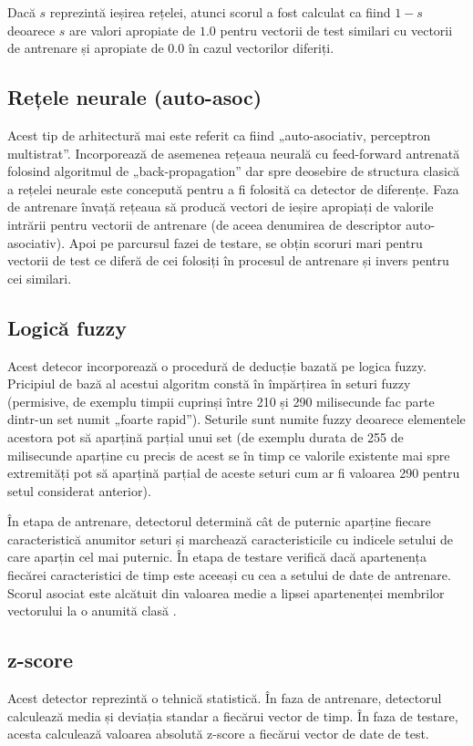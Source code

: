 \documentclass[9pt,shortpaper,twoside,web]{ieeecolor}
\begin{document}
	Dacă $s$ reprezintă ieșirea rețelei, atunci scorul a fost calculat ca fiind $1 - s$ deoarece $s$ are valori apropiate de $1.0$  pentru vectorii de test similari cu vectorii de antrenare și apropiate de $0.0$ în cazul vectorilor diferiți.

\subsection{Rețele neurale (auto-asoc)}
	Acest tip de arhitectură mai este referit ca fiind „auto-asociativ, perceptron multistrat”. Incorporează de asemenea rețeaua neurală cu feed-forward antrenată folosind algoritmul de „back-propagation” dar spre deosebire de structura clasică a rețelei neurale este concepută pentru a fi folosită ca detector de diferențe\cite{13}. Faza de antrenare învață rețeaua să producă vectori de ieșire apropiați de valorile intrării pentru vectorii de antrenare (de aceea denumirea de descriptor auto-asociativ). Apoi pe parcursul fazei de testare, se obțin scoruri mari pentru vectorii de test ce diferă de cei folosiți în procesul de antrenare și invers pentru cei similari.

\subsection{Logică fuzzy}
	Acest detecor incorporează o procedură de deducție bazată pe logica fuzzy. Pricipiul de bază al acestui algoritm constă în împărțirea în seturi fuzzy (permisive, de exemplu timpii cuprinși între 210 și 290 milisecunde fac parte dintr-un set numit „foarte rapid”). Seturile sunt numite fuzzy deoarece elementele acestora pot să aparțină parțial unui set (de exemplu durata de 255 de milisecunde aparține cu precis de acest se în timp ce valorile existente mai spre extremități pot să aparțină parțial de aceste seturi cum ar fi valoarea 290 pentru setul considerat anterior).
	
	În etapa de antrenare, detectorul determină cât de puternic aparține fiecare caracteristică anumitor seturi și marchează caracteristicile cu indicele setului de care aparțin cel mai puternic. În etapa de testare verifică dacă apartenența fiecărei caracteristici de timp este aceeași cu cea a setului de date de antrenare. Scorul asociat este alcătuit din valoarea medie a lipsei apartenenței membrilor vectorului la o anumită clasă \cite{b13}. 
	
\subsection{z-score}
	Acest detector reprezintă o tehnică statistică. În faza de antrenare, detectorul calculează media și deviația standar a fiecărui vector de timp. În faza de testare, acesta calculează valoarea absolută z-score a fiecărui vector de date de test.
	
\end{document}
